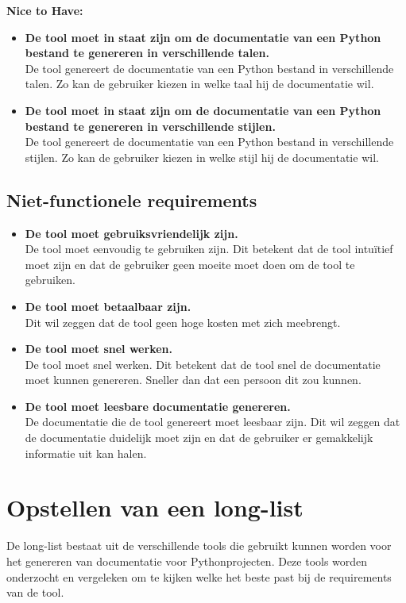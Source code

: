 \textbf{Nice to Have:}
\begin{itemize}
    \item \textbf{De tool moet in staat zijn om de documentatie van een Python bestand te genereren in verschillende talen.}\\
    De tool genereert de documentatie van een Python bestand in verschillende talen. Zo kan de gebruiker kiezen in welke taal hij de documentatie wil.
    \item \textbf{De tool moet in staat zijn om de documentatie van een Python bestand te genereren in verschillende stijlen.}\\
    De tool genereert de documentatie van een Python bestand in verschillende stijlen. Zo kan de gebruiker kiezen in welke stijl hij de documentatie wil.
\end{itemize}

\subsection{Niet-functionele requirements}
\label{sec:niet-functionele-requirements}
\begin{itemize}
    \item \textbf{De tool moet gebruiksvriendelijk zijn.}\\
    De tool moet eenvoudig te gebruiken zijn. Dit betekent dat de tool intuïtief moet zijn en dat de gebruiker geen moeite moet doen om de tool te gebruiken.
    \item \textbf{De tool moet betaalbaar zijn.}\\
    Dit wil zeggen dat de tool geen hoge kosten met zich meebrengt.
    \item \textbf{De tool moet snel werken.}\\
    De tool moet snel werken. Dit betekent dat de tool snel de documentatie moet kunnen genereren. Sneller dan dat een persoon dit zou kunnen.
    \item \textbf{De tool moet leesbare documentatie genereren.}\\
    De documentatie die de tool genereert moet leesbaar zijn. Dit wil zeggen dat de documentatie duidelijk moet zijn en dat de gebruiker er gemakkelijk informatie uit kan halen.    
\end{itemize}

\section{Opstellen van een long-list}
\label{sec:long-list}
De long-list bestaat uit de verschillende tools die gebruikt kunnen worden voor het genereren van documentatie voor Pythonprojecten.
Deze tools worden onderzocht en vergeleken om te kijken welke het beste past bij de requirements van de tool.

